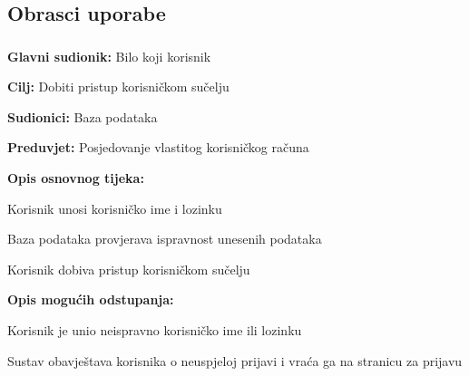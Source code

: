 			\eject{}
			
			\subsection{Obrasci uporabe}
				
				\subsubsection{}

					\noindent {}
					\begin{packed_item}
	
						\item \textbf{Glavni sudionik:} Bilo koji korisnik
						\item  \textbf{Cilj:} Dobiti pristup korisničkom sučelju
						\item  \textbf{Sudionici:} Baza podataka
						\item  \textbf{Preduvjet:} Posjedovanje vlastitog korisničkog računa
						\item  \textbf{Opis osnovnog tijeka:}
						
						\item[] \begin{packed_enum}
	
							\item Korisnik unosi korisničko ime i lozinku
							\item Baza podataka provjerava ispravnost unesenih podataka
							\item Korisnik dobiva pristup korisničkom sučelju

						\end{packed_enum}
						
						\item  \textbf{Opis mogućih odstupanja:}
						
						\item[] \begin{packed_item}
	
							\item[2.a] Korisnik je unio neispravno korisničko ime ili lozinku
							\item[] \begin{packed_enum}
								
								\item Sustav obavještava korisnika o neuspjeloj prijavi i vraća ga na stranicu za prijavu
								
							\end{packed_enum}
							
						\end{packed_item}

					\end{packed_item}


